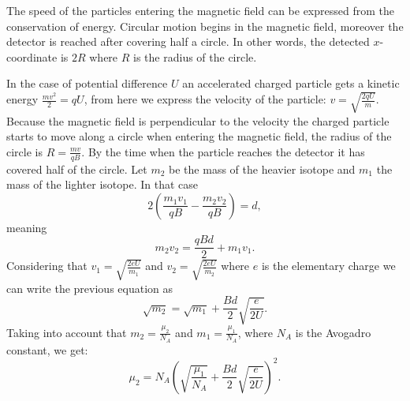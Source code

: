 {\ifEngHint
The speed of the particles entering the magnetic field can be expressed from the conservation of energy. Circular motion begins in the magnetic field, moreover the detector is reached after covering half a circle. In other words, the detected $x$-coordinate is $2R$ where $R$ is the radius of the circle.
\fi


\ifEngSolution
In the case of potential difference $U$ an accelerated charged particle gets a kinetic energy $\frac{mv^{2}}{2}=qU$, from here we express the velocity of the particle: $v=\sqrt{\frac{2qU}{m}}$. Because the magnetic field is perpendicular to the velocity the charged particle starts to move along a circle when entering the magnetic field, the radius of the circle is $R=\frac{mv}{qB}$. By the time when the particle reaches the detector it has covered half of the circle. Let $m_{2}$ be the mass of the heavier isotope and $m_{1}$ the mass of the lighter isotope. In that case
\[ 
2\left(\frac{m_{1}v_{1}}{qB}-\frac{m_{2}v_{2}}{qB}\right)=d, 
\]
meaning 
\[ 
m_{2}v_{2}=\frac{qBd}{2}+m_{1}v_{1 }.
\]
Considering that $v_{1}=\sqrt{\frac{2eU}{m_{1}}}$ and $v_{2}=\sqrt{\frac{2eU}{m_{2}}}$ where $e$ is the elementary charge we can write the previous equation as 
\[ \sqrt{m_{2}}=\sqrt{m_{1}}+\frac{Bd}{2}\sqrt{\frac{e}{2U}}. \]
Taking into account that $m_{2}=\frac{\mu_{2}}{N_{A}}$ and $m_{1}=\frac{\mu_{1}}{N_{A}}$, where $N_{A}$ is the Avogadro constant, we get:
\[ \mu_{2}=N_{A}\left(\sqrt{\frac{\mu_{1}}{N_{A}}}+\frac{Bd}{2}\sqrt{\frac{e}{2U}}\right)^{2}.\]
\fi
}